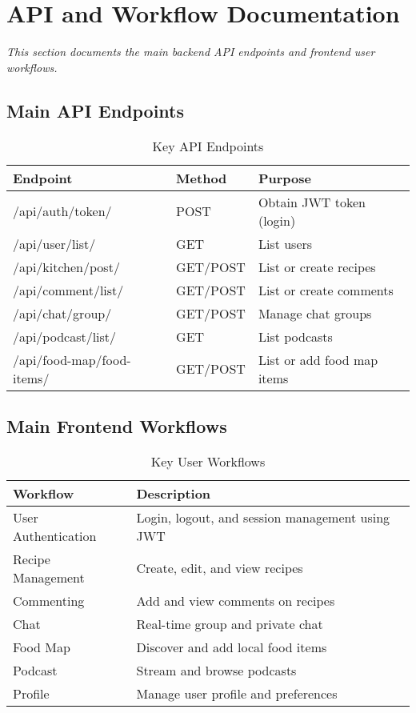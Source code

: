 \documentclass[conference]{IEEEtran}
\begin{document}
\section{API and Workflow Documentation}
\textit{This section documents the main backend API endpoints and frontend user workflows.}
\subsection{Main API Endpoints}
\begin{table}[h]
\centering
\caption{Key API Endpoints}
\begin{tabular}{|l|l|p{3.5cm}|}
\hline
\textbf{Endpoint} & \textbf{Method} & \textbf{Purpose} \\
\hline
/api/auth/token/ & POST & Obtain JWT token (login) \\
/api/user/list/ & GET & List users \\
/api/kitchen/post/ & GET/POST & List or create recipes \\
/api/comment/list/ & GET/POST & List or create comments \\
/api/chat/group/ & GET/POST & Manage chat groups \\
/api/podcast/list/ & GET & List podcasts \\
/api/food-map/food-items/ & GET/POST & List or add food map items \\
\hline
\end{tabular}
\end{table}

\subsection{Main Frontend Workflows}
\begin{table}[h]
\centering
\caption{Key User Workflows}
\begin{tabular}{|l|p{5cm}|}
\hline
\textbf{Workflow} & \textbf{Description} \\
\hline
User Authentication & Login, logout, and session management using JWT \\
Recipe Management & Create, edit, and view recipes \\
Commenting & Add and view comments on recipes \\
Chat & Real-time group and private chat \\
Food Map & Discover and add local food items \\
Podcast & Stream and browse podcasts \\
Profile & Manage user profile and preferences \\
\hline
\end{tabular}
\end{table}
\end{document}
